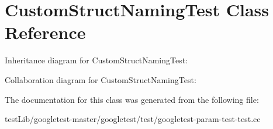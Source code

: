\hypertarget{classCustomStructNamingTest}{}\section{Custom\+Struct\+Naming\+Test Class Reference}
\label{classCustomStructNamingTest}


Inheritance diagram for Custom\+Struct\+Naming\+Test\+:


Collaboration diagram for Custom\+Struct\+Naming\+Test\+:


The documentation for this class was generated from the following file\+:\begin{DoxyCompactItemize}
\item 
test\+Lib/googletest-\/master/googletest/test/googletest-\/param-\/test-\/test.\+cc\end{DoxyCompactItemize}
